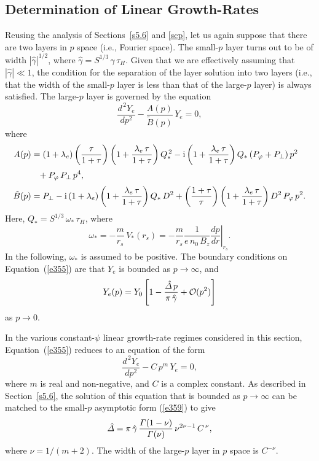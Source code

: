 \documentclass[notitlepage,12pt]{article}
\begin{document}
\subsection{Determination of Linear Growth-Rates}\label{s6.3}
Reusing the analysis of Sections~\ref{s5.6} and \ref{scp}, let us again suppose that there are two layers in $p$ space (i.e., Fourier space). The
small-$p$ layer turns out to be of width $|\hat{\gamma}|^{1/2}$, where $\hat{\gamma} = S^{1/3}\,\gamma\,\tau_H$. Given that we are effectively assuming that
$|\hat{\gamma}|\ll 1$, the condition for the separation of the layer solution into two layers (i.e., that the width of the small-$p$ layer is less than that of the large-$p$ layer) is always satisfied. The large-$p$ layer is governed by the equation
\begin{equation}\label{e355}
\frac{d^{\,2} Y_e}{dp^2} - \frac{A(p)}{\tilde{B}(p)} \,Y_e =0,
\end{equation}
where 
\begin{align}
A(p) &= (1+\lambda_e)\left(\frac{\tau}{1+\tau}\right)\left(1+ \frac{\lambda_e\,\tau}{1+\tau}\right)Q_\ast^{\,2}
-{\rm i}\left(1+\frac{\lambda_e\,\tau}{1+\tau}\right)Q_\ast\,(P_\varphi+P_\perp)\,p^2\nonumber\\[0.5ex]
&\phantom{=} + P_\varphi\,P_\perp\,p^4,\\[0.5ex]
\tilde{B}(p)&= P_\perp - {\rm i}\,(1+\lambda_e)\left(1+\frac{\lambda_e\,\tau}{1+\tau}\right)Q_\ast\,D^2 +\left(\frac{1+\tau}{\tau}\right)\left(1+\frac{\lambda_e\,\tau}{1+\tau}\right) D^2\,P_\varphi\,p^2.
\end{align}
Here, $Q_\ast = S^{1/3}\,\omega_\ast\,\tau_H$, where
\begin{equation}\label{omega}
\omega_\ast = -\frac{m}{r_s}\,V_\ast(r_s)= -\frac{m}{r_s}\frac{1}{e\,n_0\,B_z}\left.\frac{dp}{dr}\right|_{r_s}.
\end{equation}
In the following, $\omega_\ast$ is assumed to be positive. The boundary conditions on Equation~(\ref{e355}) are
that $Y_e$ is bounded as $p\rightarrow\infty$, and
\begin{equation}\label{e359}
Y_e(p)= Y_0\left[1-\frac{\hat{\mit\Delta}\,p}{\pi\,\hat{\gamma}} + {\cal O}(p^2)\right]
\end{equation}
as $p\rightarrow 0$. 

In the various constant-$\psi$ linear growth-rate regimes considered in this section, Equation~(\ref{e355}) reduces to an equation of the form
\begin{equation}
\frac{d^{\,2} Y_e}{dp^2} - C\,p^m\,Y_e = 0,
\end{equation}
where $m$ is real and non-negative, and $C$ is a complex constant. As described in Section~\ref{s5.6}, the solution of this
equation that is bounded as $p\rightarrow \infty$ can be matched to the small-$p$ asymptotic form (\ref{e359}) to give 
\begin{equation}
\hat{\mit\Delta} = \pi\,\hat{\gamma}\,\frac{{\mit\Gamma}(1-\nu)}{{\mit\Gamma}(\nu)}\,\nu^{2\nu-1}\,C^{\,\nu},
\end{equation}
where $\nu=1/(m+2)$. The width of the large-$p$ layer in $p$ space is $C^{-\nu}$. 
\end{document}

